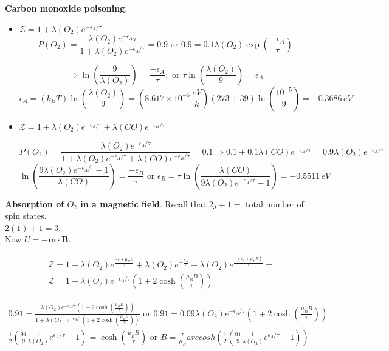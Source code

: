  \textbf{Carbon monoxide poisoning}.  \begin{itemize}
\item[(a)]$\mathcal{Z} = 1 +  \lambda(O_2) e^{-\epsilon_A/\tau}$
\[
P(O_2) =  \frac{ \lambda(O_2) e^{-\epsilon_A}{\tau} }{ 1 + \lambda(O_2) e^{-\epsilon_A/\tau} } = 0.9 \text{ or } 0.9 = 0.1 \lambda(O_2) \exp{ \left( \frac{ - \epsilon_A}{\tau} \right) }
\]

\[
\Longrightarrow \ln{ \left( \frac{ 9 }{ \lambda(O_2) } \right)} = \frac{- \epsilon_A}{\tau}; \text{ or } \tau \ln{ \left( \frac{ \lambda(O_2)}{ 9} \right) } = \epsilon_A 
\]
\[
\boxed{ \epsilon_A = (k_B T) \ln{ \left( \frac{ \lambda(O_2)}{ 9 } \right)} } = (8.617 \times 10^{-5} \, \frac{eV}{k} )(273 + 39) \ln{ \left( \frac{10^{-5}}{9} \right)} = - 0.3686 \, eV
\]
\item[(b)] $\mathcal{Z} = 1 + \lambda(O_2) e^{- \epsilon_A/\tau} + \lambda(CO) e^{-\epsilon_B/\tau}$

\[
P(O_2) = \frac{ \lambda(O_2) e^{-\epsilon_A/\tau} }{ 1 + \lambda(O_2) e^{- \epsilon_A/\tau} + \lambda(CO) e^{-\epsilon_B /\tau} } = 0.1 \Longrightarrow 0.1 + 0.1 \lambda(CO) e^{-\epsilon_B/\tau} = 0.9 \lambda(O_2) e^{-\epsilon_A/\tau}
\]
\[
\ln{ \left( \frac{ 9 \lambda(O_2) e^{-\epsilon_A/\tau} -1}{ \lambda(CO) } \right)} = \frac{ -\epsilon_B}{\tau} \text{ or } \boxed{ \epsilon_B = \tau \ln{ \left( \frac{ \lambda(CO) }{ 9 \lambda(O_2) e^{-\epsilon_A/\tau} -1 } \right) } } = -0.5511 \, eV
\]
\end{itemize}

 \textbf{Absorption of $O_2$ in a magnetic field}.  Recall that $2j + 1 = $ total number of spin states.  \\
$2(1) + 1= 3$.  \\
Now $U = - \mathbf{m}\cdot \mathbf{B}$.  

\[
\begin{aligned}
  & \mathcal{Z} = 1 + \lambda(O_2) e^{ \frac{ - \epsilon + \mu_B B}{ \tau} } + \lambda(O_2) e^{ -\frac{ \epsilon_A}{\tau} } + \lambda(O_2) e^{ \frac{ - (\epsilon_A + \mu_B B) }{ \tau} } = \\
  & \mathcal{Z} = 1 + \lambda(O_2) e^{- \epsilon_A /\tau} ( 1 + 2 \cosh{ \left( \frac{ \mu_B B}{ \tau} \right) } )
\end{aligned}
\]

\[
\begin{gathered}
  0.91 = \frac{ \lambda(O_2) e^{- \epsilon_A/\tau} ( 1 + 2 \cosh{ \left( \frac{ \mu_B B}{ \tau } \right) } ) }{ 1 + \lambda(O_2) e^{ - \epsilon_A/\tau} ( 1 + 2 \cosh{ \left( \frac{ \mu_B B }{ \tau } \right) } ) } \text{ or } 0.91 = 0.09 \lambda(O_2) e^{ - \epsilon_A/\tau} ( 1 + 2 \cosh{ \left( \frac{ \mu_B B}{ \tau} \right) } ) \\ 
  \frac{1}{2} \left( \frac{ 91}{ 9} \frac{1}{ \lambda(O_2) } e^{ \epsilon_A/\tau} -1 \right) = \cosh{ \left( \frac{ \mu_B B}{\tau} \right) } \text{ or } B = \frac{ \tau}{ \mu_B} arccosh{ \left( \frac{1}{2} \left( \frac{91}{9} \frac{1}{ \lambda(O_2) } e^{ \epsilon_A/\tau} -1 \right) \right) } 
\end{gathered}
\]

